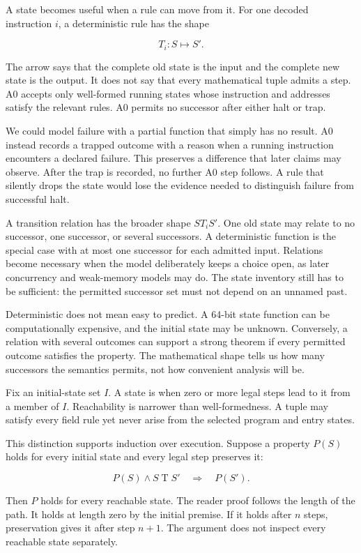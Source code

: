 A state becomes useful when a rule can move from it. For one decoded
instruction \(i\), a deterministic rule has the shape

\[
T_i:S\longmapsto S'.
\]

The arrow says that the complete old state is the input and the complete new
state is the output. It does not say that every mathematical tuple admits a
step. A0 accepts only well-formed running states whose instruction and
addresses satisfy the relevant rules. A0 permits no successor after either
halt or trap.

We could model failure with a partial function that simply has no result. A0
instead records a trapped outcome with a reason when a running instruction
encounters a declared failure. This preserves a difference that later claims
may observe. After the trap is recorded, no further A0 step follows. A rule
that silently drops the state would lose the evidence needed to distinguish
failure from successful halt.

A transition relation has the broader shape \(S\mathrel{T_i}S'\). One old
state may relate to no successor, one successor, or several successors. A
deterministic function is the special case with at most one successor for each
admitted input. Relations become necessary when the model deliberately keeps
a choice open, as later concurrency and weak-memory models may do. The state
inventory still has to be sufficient: the permitted successor set must not
depend on an unnamed past.

Deterministic does not mean easy to predict. A 64-bit state function can be
computationally expensive, and the initial state may be unknown. Conversely,
a relation with several outcomes can support a strong theorem if every
permitted outcome satisfies the property. The mathematical shape tells us how
many successors the semantics permits, not how convenient analysis will be.

Fix an initial-state set \(I\). A state is  when zero or
more legal steps lead to it from a member of \(I\). Reachability is narrower
than well-formedness. A tuple may satisfy every field rule yet never arise
from the selected program and entry states.

This distinction supports induction over execution. Suppose a property
\(P(S)\) holds for every initial state and every legal step preserves it:

\[
P(S)\mathbin{\wedge}S\mathrel{T}S'\quad\Longrightarrow\quad P(S').
\]

Then \(P\) holds for every reachable state. The reader proof follows the
length of the path. It holds at length zero by the initial premise. If it holds
after \(n\) steps, preservation gives it after step \(n+1\). The argument does
not inspect every reachable state separately.

